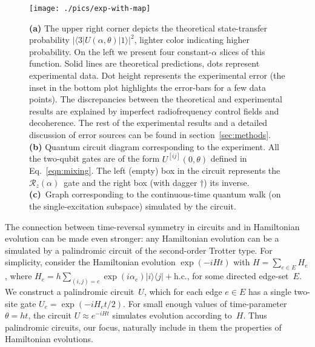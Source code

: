 \documentclass[aps,prx,10pt,
               superscriptaddress,
               twocolumn,
               longbibliography,
showpacs]{revtex4-1}
\theoremstyle{plain}
\theoremstyle{definition}
\newcommand{\bra}[1]{\mbox{$\langle #1|$}}
\newcommand{\ket}[1]{\ensuremath{|#1\rangle}}
\newcommand{\zrot}{\mathcal{R}_z}
\newcommand{\site}[1]{^{[#1]}}  %
\newcommand{\ind}[1]{_{#1}}  %
\begin{document}
\begin{figure*}
    \centering
    \texttt{[image: ./pics/exp-with-map]}
    \caption{%
      \textbf{(a)}  The upper right corner depicts the theoretical state-transfer probability
      $|\bra{3} U(\alpha, \theta) \ket{1}|^2$, lighter color indicating higher probability.
      On the left we present four constant-$\alpha$ slices of this function. 
      Solid lines are theoretical predictions, dots represent experimental data.
      Dot height represents the experimental error
      (the inset in the bottom plot highlights the error-bars for a few data points).
      The discrepancies between the theoretical and experimental results are explained by
      imperfect radiofrequency control fields and decoherence.
      The rest of the experimental results and a detailed discussion of error
      sources can be found in section~\ref{sec:methods}.
      \textbf{(b)} Quantum circuit diagram corresponding to the experiment.
      All the two-qubit gates are of the form $U\site{ij}(0, \theta)$ defined in
      Eq.~\eqref{eqn:mixing}.
      The left (empty) box in the circuit represents the $\zrot(\alpha)$~gate and
the right box (with dagger $\dagger$) its inverse.
\textbf{(c)}~Graph corresponding to the continuous-time quantum walk (on the single-excitation subspace) simulated by the circuit.
      \label{fig:theo+exp}
    }
\end{figure*}

The connection between time-reversal symmetry in circuits and in Hamiltonian evolution can be made even stronger: 
any Hamiltonian evolution can be a simulated by a palindromic circuit of the second-order Trotter type.
For simplicity, consider the Hamiltonian evolution $\exp (-iH t)$ with
$H = \sum_{e \in E} H_e$, where
$H_e = h \sum_{(i,j) = e} \exp(i\alpha_e) \ket{i} \bra{j} +\text{h.c.}$, for some directed edge-set~$E$.
We construct a palindromic circuit~$U$, which for each edge $e \in E$ has a single two-site gate
$U\ind{e} = \exp(-i H\ind{e} t/2)$.
For small enough values of time-parameter $\theta = ht$, the circuit $U \approx e^{-iH t}$ simulates evolution according to~$H$.
Thus palindromic circuits, our focus, naturally include in them the properties of Hamiltonian evolutions.
\end{document}
